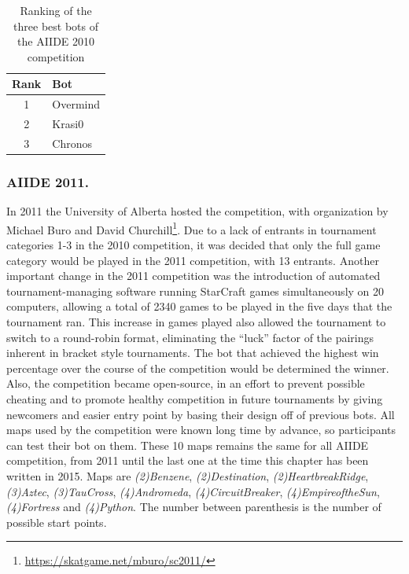 \documentclass{llncs}
\begin{document}
\begin{table}[!t]
\caption{Ranking of the three best bots of the AIIDE 2010 competition}
\label{tab:aiide2010}
\centering
\begin{tabular}{|c|l|}
\hline
{\bfseries Rank} & {\bfseries Bot}\\
\hline
1 & Overmind \\
2 & Krasi0 \\
3 & Chronos \\
\hline
\end{tabular}
\end{table}

\subsubsection*{AIIDE 2011.}

In 2011 the University of Alberta hosted the competition, with organization by Michael Buro and
David Churchill\footnote{\url{https://skatgame.net/mburo/sc2011/}}. Due to a lack of entrants in tournament categories 1-3 in the 2010 competition, it was
decided that only  the full game category would be  played in the 2011
competition, with 13 entrants. Another important
change in the 2011 competition was the introduction of automated tournament-managing software running
StarCraft games simultaneously on 20 computers, allowing a total of 2340 games to be played in the five days that the tournament ran. 
This increase in games played also allowed the tournament
to switch to a round-robin format, eliminating the ``luck'' factor of the pairings inherent in bracket
style tournaments. The bot that achieved the highest win percentage over the course of the competition would
be determined the winner. Also, the competition became open-source, in an effort 
to prevent possible cheating and to promote healthy competition in future tournaments by giving
newcomers  and  easier entry  point  by  basing  their design  off  of
previous bots. All  maps used by the competition were  known long time
by advance, so participants can test their bot on them.  These 10 maps
remains the same for all AIIDE  competition, from 2011 until the last
one  at the  time this  chapter  has been  written in  2015. Maps  are
\emph{(2)Benzene},    \emph{(2)Destination}, \emph{(2)HeartbreakRidge},  \emph{(3)Aztec},  \emph{(3)TauCross},  \emph{(4)Andromeda},
\emph{(4)CircuitBreaker}, \emph{(4)EmpireoftheSun}, \emph{(4)Fortress}
and \emph{(4)Python}. The number between  parenthesis is the number of
possible start points.
\end{document}
